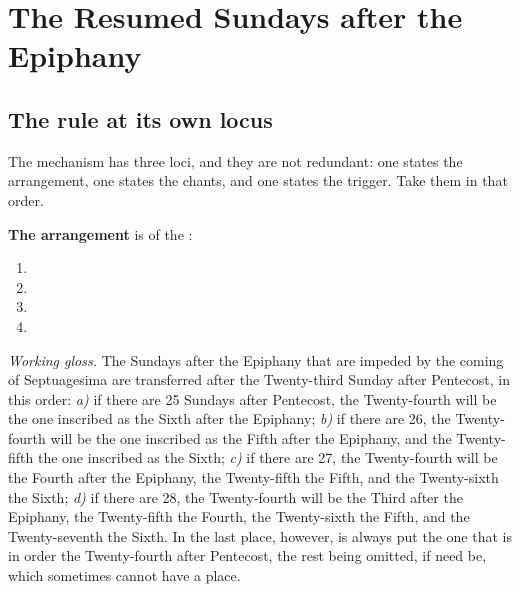 \section{The Resumed Sundays after the Epiphany}
\label{sec:resumed}

\subsection{The rule at its own locus}

The mechanism has three loci, and they are not redundant: one states the arrangement, one
states the chants, and one states the trigger. Take them in that order.

\textbf{The arrangement} is  of the :

\begin{studyframe}
\begin{enumerate}[label=\textit{\alph*})~, leftmargin=1.9em, itemsep=0.15em, topsep=0.25em]
\item {}
\item {}
\item {}
\item {}
\end{enumerate}
\medskip

\textit{Working gloss.} The Sundays after the Epiphany that are impeded by the coming of
Septuagesima are transferred after the Twenty-third Sunday after Pentecost, in this order:
\textit{a)} if there are 25 Sundays after Pentecost, the Twenty-fourth will be the one inscribed
as the Sixth after the Epiphany; \textit{b)} if there are 26, the Twenty-fourth will be the one
inscribed as the Fifth after the Epiphany, and the Twenty-fifth the one inscribed as the Sixth;
\textit{c)} if there are 27, the Twenty-fourth will be the Fourth after the Epiphany, the
Twenty-fifth the Fifth, and the Twenty-sixth the Sixth; \textit{d)} if there are 28, the
Twenty-fourth will be the Third after the Epiphany, the Twenty-fifth the Fourth, the
Twenty-sixth the Fifth, and the Twenty-seventh the Sixth. In the last place, however, is always
put the one that is in order the Twenty-fourth after Pentecost, the rest being omitted, if need
be, which sometimes cannot have a place.
\end{studyframe}

